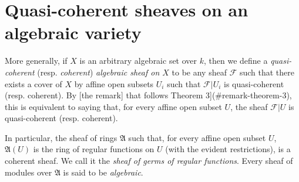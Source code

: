 \documentclass[british]{article}
\begin{document}
\section{Quasi-coherent sheaves on an algebraic
variety}\label{section-6}

More generally, if \(X\) is an arbitrary algebraic set over \(k\), then
we define a \emph{quasi-coherent} (resp. \emph{coherent})
\emph{algebraic sheaf on \(X\)} to be any sheaf \({\mathscr{F}}\) such
that there exists a cover of \(X\) by affine open subsets \(U_i\) such
that \({\mathscr{F}}|U_i\) is quasi-coherent (resp. coherent). By {[}the
remark{]} that follows Theorem 3{]}(\#remark-theorem-3), this is
equivalent to saying that, for every affine open subset \(U\), the sheaf
\({\mathscr{F}}|U\) is quasi-coherent (resp. coherent).

In particular, the sheaf of rings \(\mathfrak{A}\) such that, for every
affine open subset \(U\), \(\mathfrak{A}(U)\) is the ring of regular
functions on \(U\) (with the evident restrictions), is a coherent sheaf.
We call it the \emph{sheaf of germs of regular functions}. Every sheaf
of modules over \(\mathfrak{A}\) is said to be \emph{algebraic}.


\nocite{*}
\printbibliography[heading=bibintoc,title=Bibliography]
\end{document}
